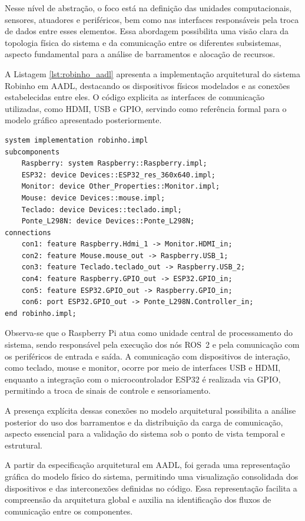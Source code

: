 Nesse nível de abstração, o foco está na definição das unidades computacionais, sensores, atuadores e periféricos, bem como nas interfaces responsáveis pela troca de dados entre esses elementos. Essa abordagem possibilita uma visão clara da topologia física do sistema e da comunicação entre os diferentes subsistemas, aspecto fundamental para a análise de barramentos e alocação de recursos.

A Listagem \ref{lst:robinho_aadl} apresenta a implementação arquitetural do sistema Robinho em AADL, destacando os dispositivos físicos modelados e as conexões estabelecidas entre eles. O código explicita as interfaces de comunicação utilizadas, como HDMI, USB e GPIO, servindo como referência formal para o modelo gráfico apresentado posteriormente.


\begin{lstlisting}[caption={Especificação arquitetural do sistema Robinho em AADL}, label={lst:robinho_aadl}]
system implementation robinho.impl
subcomponents
    Raspberry: system Raspberry::Raspberry.impl;
    ESP32: device Devices::ESP32_res_360x640.impl;
    Monitor: device Other_Properties::Monitor.impl;
    Mouse: device Devices::mouse.impl;
    Teclado: device Devices::teclado.impl;
    Ponte_L298N: device Devices::Ponte_L298N;
connections
    con1: feature Raspberry.Hdmi_1 -> Monitor.HDMI_in;
    con2: feature Mouse.mouse_out -> Raspberry.USB_1;
    con3: feature Teclado.teclado_out -> Raspberry.USB_2;
    con4: feature Raspberry.GPIO_out -> ESP32.GPIO_in;
    con5: feature ESP32.GPIO_out -> Raspberry.GPIO_in;
    con6: port ESP32.GPIO_out -> Ponte_L298N.Controller_in;
end robinho.impl;
\end{lstlisting}
    
Observa-se que o Raspberry Pi atua como unidade central de processamento do sistema, sendo responsável pela execução dos nós ROS~2 e pela comunicação com os periféricos de entrada e saída. A comunicação com dispositivos de interação, como teclado, mouse e monitor, ocorre por meio de interfaces USB e HDMI, enquanto a integração com o microcontrolador ESP32 é realizada via GPIO, permitindo a troca de sinais de controle e sensoriamento.

A presença explícita dessas conexões no modelo arquitetural possibilita a análise posterior do uso dos barramentos e da distribuição da carga de comunicação, aspecto essencial para a validação do sistema sob o ponto de vista temporal e estrutural.

A partir da especificação arquitetural em AADL, foi gerada uma representação gráfica do modelo físico do sistema, permitindo uma visualização consolidada dos dispositivos e das interconexões definidas no código. Essa representação facilita a compreensão da arquitetura global e auxilia na identificação dos fluxos de comunicação entre os componentes.


